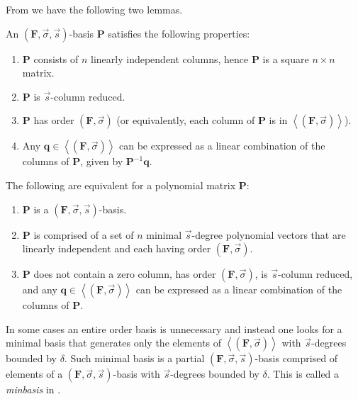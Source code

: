 From \citep{BL1997} we have the following two lemmas. 
\begin{lem}
\label{lem:orderBasisProperty} An $\left(\mathbf{F},\vec{\sigma},\vec{s}\right)$-basis
$\mathbf{P}$ satisfies the following properties: 
\begin{enumerate}
\item $\mathbf{P}$ consists of $n$ linearly independent columns, hence
$\mathbf{P}$ is a square $n\times n$ matrix. 
\item $\mathbf{P}$ is $\vec{s}$-column reduced. 
\item $\mathbf{P}$ has order $\left(\mathbf{F},\vec{\sigma}\right)$ (or
equivalently, each column of $\mathbf{P}$ is in $\left\langle (\mathbf{F},\vec{\sigma})\right\rangle $). 
\item Any $\mathbf{q}\in\left\langle \left(\mathbf{F},\vec{\sigma}\right)\right\rangle $
can be expressed as a linear combination of the columns of $\mathbf{P}$,
given by $\mathbf{P}^{-1}\mathbf{q}$. 
\end{enumerate}
\label{lem:orderBasisEquivalence}The following are equivalent for
a polynomial matrix \textbf{$\mathbf{P}$}: 
\begin{enumerate}
\item $\mathbf{P}$ is a $\left(\mathbf{F},\vec{\sigma},\vec{s}\right)$-basis. 
\item $\mathbf{P}$ is comprised of a set of $n$ minimal $\vec{s}$-degree
polynomial vectors that are linearly independent and each having order
$\left(\mathbf{F},\vec{\sigma}\right)$. 
\item \label{enu:reduced+generator}$\mathbf{P}$ does not contain a zero
column, has order $\left(\mathbf{F},\vec{\sigma}\right)$, is $\vec{s}$-column
reduced, and any $\mathbf{q}\in\left\langle \left(\mathbf{F},\vec{\sigma}\right)\right\rangle $
can be expressed as a linear combination of the columns of $\mathbf{P}$. 
\end{enumerate}
\end{lem}
In some cases an entire order basis is unnecessary and instead one
looks for a minimal basis that generates only the elements of $\left\langle \left(\mathbf{F},\vec{\sigma}\right)\right\rangle $
with $\vec{s}$-degrees bounded by $\delta$. Such minimal basis is
a partial $\left(\mathbf{F},\vec{\sigma},\vec{s}\right)$-basis comprised
of elements of a $\left(\mathbf{F},\vec{\sigma},\vec{s}\right)$-basis
with $\vec{s}$-degrees bounded by $\delta$. This is called a \emph{minbasis}
in \citet{Storjohann:2006}. 
